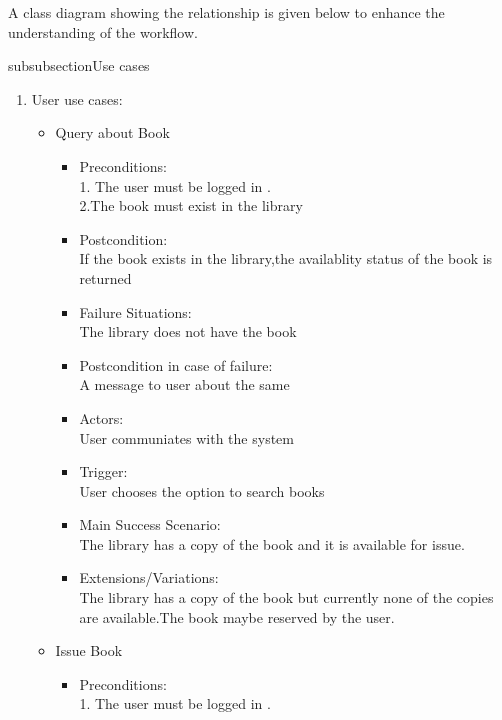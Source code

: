 \documentclass{article}
\begin{document}
A class diagram showing the relationship is given below to enhance the understanding of the workflow.

subsubsection{Use cases}
\begin{enumerate}
\item User use cases:
	\begin{itemize}
	
	\item Query about Book\\
	\begin{itemize}
	\item Preconditions:\\
	1. The user must be logged in .\\
	2.The book must exist in the library\\
\item  Postcondition: \\If the book exists in the library,the availablity status of the book is returned\\
 \item Failure Situations:\\ The library does not have  the book \\
 \item Postcondition in case of failure:\\A message to user about the same\\
\item  Actors:\\ User communiates with the system\\
\item  Trigger:\\ User chooses the option to search books\\
 \item Main Success Scenario: \\The library has a copy of the book and it is available for issue.\\
\item  Extensions/Variations: \\The library has a copy of the book but currently none of the copies are available.The book maybe reserved by the user.
	\end{itemize}
 \item Issue Book\\
	\begin{itemize}
	 \item Preconditions:\\
	 1. The user must be logged in .\\

\end{itemize}
\end{itemize}
\end{enumerate}
\end{document}
